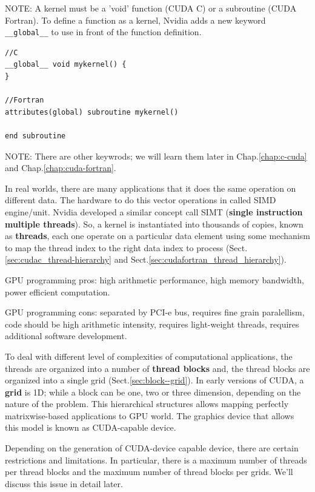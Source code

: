 NOTE: A kernel must be a 'void' function (CUDA C) or a subroutine (CUDA
Fortran). To define a function as a kernel, Nvidia adds a new keyword
\verb!__global__! to use in front of the function definition.
\begin{lstlisting}
//C
__global__ void mykernel() {
}

//Fortran
attributes(global) subroutine mykernel() 

end subroutine
\end{lstlisting}
NOTE: There are other keywrods; we will learn them later in
Chap.\ref{chap:c-cuda} and Chap.\ref{chap:cuda-fortran}.

In real worlds, there are many applications that it does the same operation on
different data. The hardware to do this vector operations in called SIMD
engine/unit. Nvidia developed a similar concept call SIMT ({\bf single
instruction multiple threads}). So, a kernel is
instantiated into thousands of copies, known as {\bf threads}, each one operate
on a particular data element using some mechanism to map the thread index to
the right data index to process (Sect.\ref{sec:cudac_thread-hierarchy} and
Sect.\ref{sec:cudafortran_thread_hierarchy}).

\begin{framed}
GPU programming pros: high arithmetic performance, high memory bandwidth, power
efficient computation.

GPU programming cons: separated by PCI-e bus, requires fine grain paralellism,
code should be high arithmetic intensity, requires light-weight threads,
requires additional software development.
\end{framed}

To deal with different level of complexities of computational applications, the
threads are organized into a number of {\bf thread blocks} and, the thread
blocks are organized into a single grid (Sect.\ref{sec:block--grid}). In early
versions of CUDA, a {\bf grid} is 1D; while a block can be one, two or three
dimension, depending on the nature of the problem. This hierarchical structures
allows mapping perfectly matrixwise-based applications to GPU world. The
graphics device that allows this model is known as CUDA-capable device.

Depending on the generation of CUDA-device capable device, there are certain
restrictions and limitations. In particular, there is a maximum number of
threads per thread blocks and the maximum number of thread blocks per grids.
We'll discuss this issue in detail later. 


